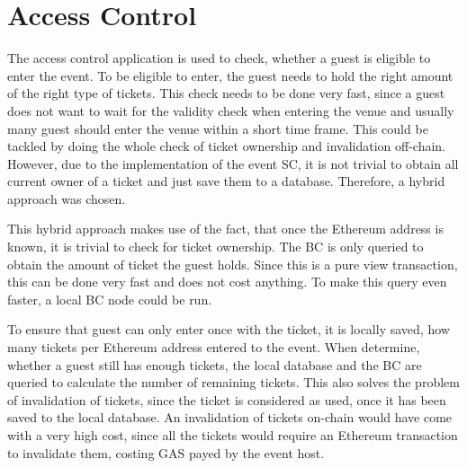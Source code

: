 \section{Access Control}
The access control application is used to check, whether a guest is eligible to enter the event. To be eligible to enter, the guest needs to hold the right amount of the right type of tickets. This check needs to be done very fast, since a guest does not want to wait for the validity check when entering the venue and usually many guest should enter the venue within a short time frame. This could be tackled by doing the whole check of ticket ownership and invalidation off-chain. However, due to the implementation of the event SC, it is not trivial to obtain all current owner of a ticket and just save them to a database. Therefore, a hybrid approach was chosen.

This hybrid approach makes use of the fact, that once the Ethereum address is known, it is trivial to check for ticket ownership. The BC is only queried to obtain the amount of ticket the guest holds. Since this is a pure view transaction, this can be done very fast and does not cost anything. To make this query even faster, a local BC node could be run.

To ensure that guest can only enter once with the ticket, it is locally saved, how many tickets per Ethereum address entered to the event. When determine, whether a guest still has enough tickets, the local database and the BC are queried to calculate the number of remaining tickets. This also solves the problem of invalidation of tickets, since the ticket is considered as used, once it has been saved to the local database. An invalidation of tickets on-chain would have come with a very high cost, since all the tickets would require an Ethereum transaction to invalidate them, costing GAS payed by the event host.
